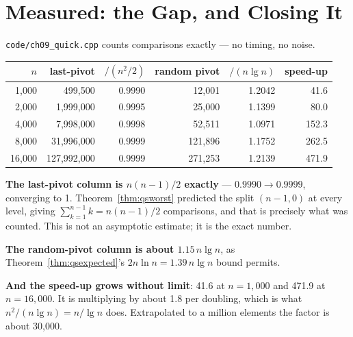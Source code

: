 \section{Measured: the Gap, and Closing It}

\begin{worked}
\texttt{code/ch09\_quick.cpp} counts comparisons exactly --- no timing, no
noise.

\begin{center}
\begin{tabular}{@{}rrrrrr@{}}
\toprule
\rowcolor{primary!15}
$n$ & last-pivot & $/(n^{2}/2)$ & random pivot & $/(n\lg n)$ & speed-up \\
\midrule
 1{,}000 &        499{,}500 & 0.9990 &      12{,}001 & 1.2042 &  41.6 \\
 2{,}000 &      1{,}999{,}000 & 0.9995 &      25{,}000 & 1.1399 &  80.0 \\
 4{,}000 &      7{,}998{,}000 & 0.9998 &      52{,}511 & 1.0971 & 152.3 \\
 8{,}000 &     31{,}996{,}000 & 0.9999 &    121{,}896 & 1.1752 & 262.5 \\
16{,}000 &    127{,}992{,}000 & 0.9999 &    271{,}253 & 1.2139 & 471.9 \\
\bottomrule
\end{tabular}
\end{center}

\smallskip
\textbf{The last-pivot column is $n(n-1)/2$ exactly} --- $0.9990 \to 0.9999$,
converging to 1. Theorem~\ref{thm:qsworst} predicted the split $(n-1,0)$ at
every level, giving $\sum_{k=1}^{n-1}k = n(n-1)/2$ comparisons, and that is
precisely what was counted. This is not an asymptotic estimate; it is the exact
number.

\smallskip
\textbf{The random-pivot column is about $1.15\,n\lg n$}, as
Theorem~\ref{thm:qsexpected}'s $2n\ln n = 1.39\,n\lg n$ bound permits.

\smallskip
\textbf{And the speed-up grows without limit}: 41.6 at $n=1{,}000$ and 471.9 at
$n=16{,}000$. It is multiplying by about 1.8 per doubling, which is what
$n^{2}/(n\lg n) = n/\lg n$ does. Extrapolated to a million elements the factor
is about 30{,}000.
\end{worked}

